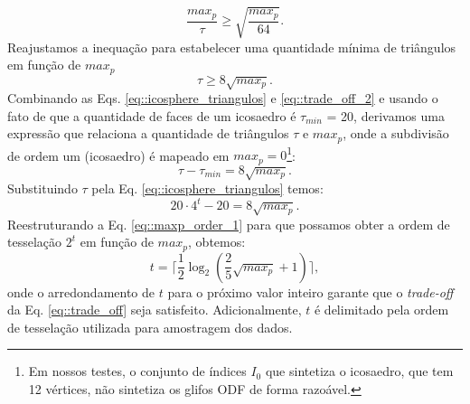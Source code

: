 \begin{equation}
\label{eq::trade_off}
    \frac{max_p}{\tau} \geq \sqrt{\frac{max_p}{64}}.
\end{equation}
Reajustamos a inequação para estabelecer uma quantidade mínima de triângulos em função de $max_p$
\begin{equation}
\label{eq::trade_off_2}
    \tau \geq 8\sqrt{max_p}
    .
\end{equation}
Combinando as Eqs. \ref{eq::icosphere_triangulos} e \ref{eq::trade_off_2} e usando o fato de que a quantidade de faces de um icosaedro é $\tau_{min}$ = 20, derivamos uma expressão que relaciona a quantidade de triângulos $\tau$ e $max_p$, onde a subdivisão de ordem um (icosaedro) é mapeado em $max_p = 0$\footnote{Em nossos testes, o conjunto de índices $I_0$ que sintetiza o icosaedro, que tem 12 vértices, não sintetiza os glifos ODF de forma razoável.}:
\begin{equation}
\label{eq::maxp_triangulo}
    \tau - \tau_{min} = 8\sqrt{max_p}.
\end{equation}
Substituindo $\tau$ pela Eq. \ref{eq::icosphere_triangulos} temos:
\begin{equation}
\label{eq::maxp_order_1}
    20 \cdot 4^t - 20 = 8\sqrt{max_p}    .
\end{equation}
Reestruturando a Eq. \ref{eq::maxp_order_1} para que possamos obter a ordem de tesselação $2^t$ em função de $max_p$, obtemos:
\begin{equation}
\label{eq::icosa_order}
     t = \lceil \frac{1}{2}\log_2{(\frac{2}{5}\sqrt{max_p} + 1)} \rceil,
\end{equation}
onde o arredondamento de $t$ para o próximo valor inteiro garante que o \textit{trade-off} da Eq. \ref{eq::trade_off} seja satisfeito. Adicionalmente, $t$ é delimitado pela ordem de tesselação utilizada para amostragem dos dados.


